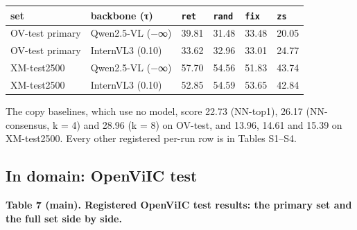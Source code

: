 \begin{longtable}[]{@{}llllll@{}}
\toprule\noalign{}
set & backbone (τ) & \texttt{ret} & \texttt{rand} & \texttt{fix} & \texttt{zs} \\
\midrule\noalign{}
\endhead
\bottomrule\noalign{}
\endlastfoot
OV-test primary & Qwen2.5-VL (−∞) & 39.81 & 31.48 & 33.48 & 20.05 \\
OV-test primary & InternVL3 (0.10) & 33.62 & 32.96 & 33.01 & 24.77 \\
XM-test2500 & Qwen2.5-VL (−∞) & 57.70 & 54.56 & 51.83 & 43.74 \\
XM-test2500 & InternVL3 (0.10) & 52.85 & 54.59 & 53.65 & 42.84 \\
\end{longtable}

The copy baselines, which use no model, score 22.73 (NN-top1), 26.17 (NN-consensus, k = 4) and 28.96
(k = 8) on OV-test, and 13.96, 14.61 and 15.39 on XM-test2500. Every other registered per-run row is
in Tables S1--S4.

\subsection{In domain: OpenViIC test}\label{in-domain-openviic-test}

\textbf{Table 7 (main). Registered OpenViIC test results: the primary set and the full set side by
side.}

